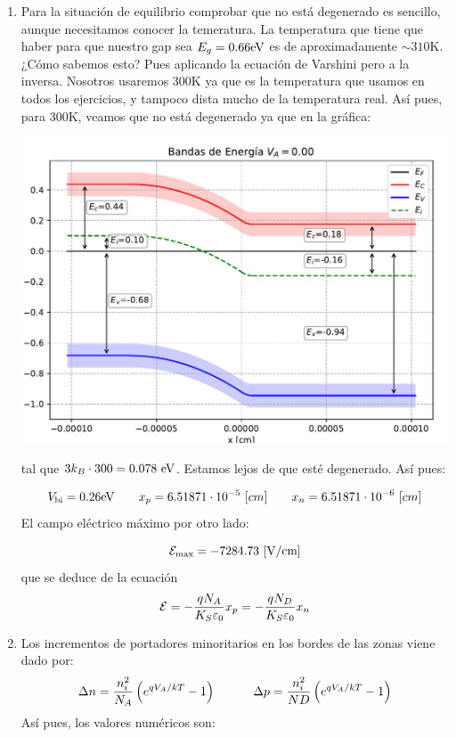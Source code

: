 \begin{enumerate}[label=\alph*)]
    \item Para la situación de equilibrio comprobar que no está degenerado es sencillo, aunque necesitamos conocer la temeratura. La temperatura que tiene que haber para que nuestro gap sea $E_g=0.66\text{eV}$ es de aproximadamente $\sim 310$K. ¿Cómo sabemos esto? Pues aplicando la ecuación de Varshini pero a la inversa. Nosotros usaremos $300$K ya que es la temperatura que usamos en todos los ejercicios, y tampoco dista mucho de la temperatura real. Así pues, para 300K, veamos que no está degenerado ya que en la gráfica: 
    \begin{center}
        \includegraphics[width=0.6\linewidth]{Ejercicios/Ch_03/03_08_Bandas.pdf}
    \end{center}
    tal que $3k_B\cdot 300=0.078 \ \text{eV}$. Estamos lejos de que esté degenerado. Así pues: 

    \begin{equation}
        V_{\text{bi}} = 0.26 \text{eV} \qquad x_p=6.51871 \cdot 10^{-5} \ [cm] \qquad 
        x_n= 6.51871 \cdot 10^{-6} \ [cm]
    \end{equation}
    El campo eléctrico máximo por otro lado: 

    \begin{equation}
        \Ecal_{\max}=-7284.73 \ [\unit{V/cm}]
    \end{equation}
    que se deduce de la ecuación 
    \begin{equation}
        \mathcal{E} = - \frac{qN_A}{K_S\varepsilon_0} x_p = - \frac{qN_D}{K_S\varepsilon_0} x_n
    \end{equation}
    \item  Los incrementos de portadores minoritarios en los bordes de las zonas viene dado por:
    \begin{equation}
        \Delta n = \frac{n_i^2}{N_A} \left( e^{qV_A/kT}-1 \right)  \quad \quad \quad 
        \Delta p = \frac{n_i^2}{ND} \left( e^{qV_A/kT}-1 \right) 
    \end{equation}
    Así pues, los valores numéricos son:


\end{enumerate}
